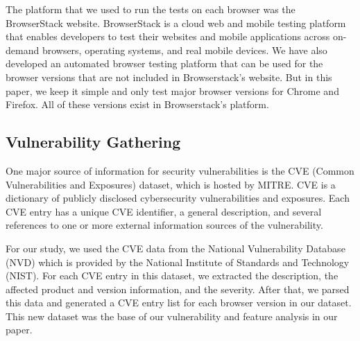 
The platform that we used to run the tests on each browser was the BrowserStack website. BrowserStack is a cloud web and mobile testing platform that enables developers to test their websites and mobile applications across on-demand browsers, operating systems, and real mobile devices.
We have also developed an automated browser testing platform that can be used for the browser versions that are not included in Browserstack's website. But in this paper, we keep it simple and only test major browser versions for Chrome and Firefox. All of these versions exist in Browserstack's platform.


\subsection{Vulnerability Gathering}
One major source of information for security vulnerabilities is the CVE (Common Vulnerabilities and Exposures) dataset,
which is hosted by MITRE. CVE is a dictionary of publicly disclosed cybersecurity vulnerabilities and exposures. Each CVE entry
has a unique CVE identifier, a general description, and several references to one or more external information sources of
the vulnerability.

For our study, we used the CVE data from the National Vulnerability Database
(NVD) which is provided by the National Institute of Standards and Technology (NIST).
For each CVE entry in this dataset, we extracted the description, the affected product and version information, and the severity. After that, we parsed this data and generated a CVE entry list for each browser version in our dataset. This new dataset was the base of our vulnerability and feature analysis in our paper.

